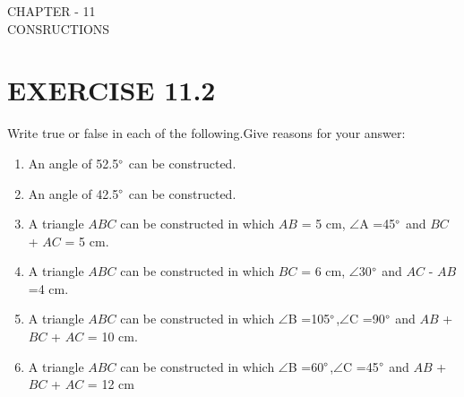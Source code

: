 \documentclass{article}
\begin{document}
\begin{center}
\textbf\large{CHAPTER - 11 \\ CONSRUCTIONS}
\section*{EXERCISE 11.2}
\end{center}
Write true or false in each of the following.Give reasons for your answer:
\begin{enumerate}
\item An angle of 52.5$\degree$ can be constructed.
\item An angle of 42.5$\degree$ can be constructed.                                         \item A triangle $ABC$ can be constructed in which $AB$ = 5 cm, $\angle$A =45$\degree$ and $BC$ + $AC$ = 5 cm.
\item A triangle $ABC$ can be constructed in which $BC$ = 6 cm, $\angle$30$\degree$ and $AC$ - $AB$=4 cm.
\item A triangle $ABC$ can be constructed in which $\angle$B =105$\degree$,$\angle$C =90$\degree$ and $AB$ + $BC$ + $AC$ = 10 cm.        
\item A triangle $ABC$ can be constructed in which $\angle$B =60$\degree$,$\angle$C =45$\degree$ and $AB$ + $BC$ + $AC$ = 12 cm           \end{enumerate}                               
\end{document}
